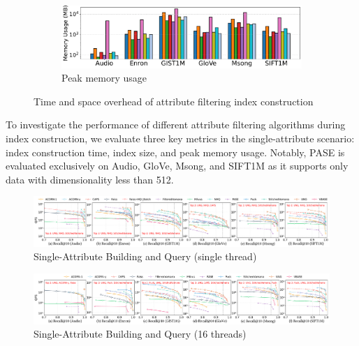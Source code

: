 \documentclass[sigconf, nonacm]{acmart}
\begin{document}
\begin{sloppypar}
\begin{figure}[t]
    \vspace{0.3cm} %

    \begin{subfigure}{\columnwidth}
        \centering
        \setlength{\abovecaptionskip}{0cm}
        \setlength{\belowcaptionskip}{-0.3cm}
        \includegraphics[width=\linewidth]{figures/indexData/exp_7_memory_mb_comparison_query1.pdf}
        \caption{Peak memory usage}
        \label{fig:memory_mb_comparison_query1}
    \end{subfigure}

    \caption{Time and space overhead of attribute filtering index construction}
    \label{fig:build_index_comparison}
\end{figure}



To investigate the performance of different attribute filtering algorithms during index construction, we evaluate three key metrics in the single-attribute scenario: index construction time, index size, and peak memory usage. Notably, PASE is evaluated exclusively on Audio, GloVe, Msong, and SIFT1M as it supports only data with dimensionality less than 512.

\begin{figure}
    \centering
        \setlength{\abovecaptionskip}{0cm}
    \setlength{\belowcaptionskip}{-0.4cm}
    \includegraphics[width=\textwidth]{figures/exp/exp_1_1_SingleLabel_1thread.pdf}
    \caption{Single-Attribute Building and Query (single thread) }
    \label{fig:exp_1_1_SingleLabel_1thread}
\end{figure}

\begin{figure}
    \centering
    \setlength{\abovecaptionskip}{0cm}
    \setlength{\belowcaptionskip}{-0.4cm}
    \includegraphics[width=\textwidth]{figures/exp/exp_1_2_SingleLabel_16thread.pdf}
    \caption{Single-Attribute Building and Query (16 threads)}
    \label{fig:exp_1_2_SingleLabel_16thread}
\end{figure}


\end{sloppypar}
\end{document}
